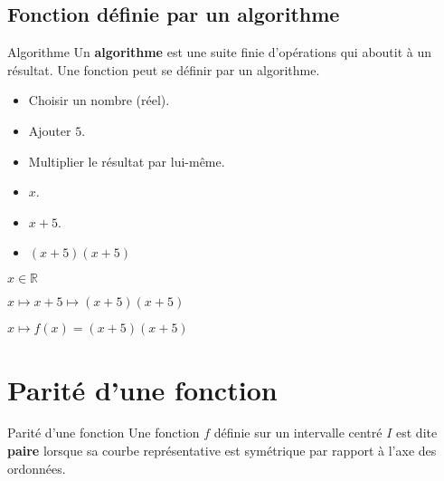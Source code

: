 \begin{pageCours}
 
 
 


\subsection{Fonction définie par un algorithme}


\begin{DefT}{Algorithme}
Un \textbf{algorithme} est une suite finie d'opérations qui aboutit à un résultat. Une fonction peut se définir par un algorithme.
\end{DefT}

 
\begin{Ex}

\begin{minipage}{0.4\linewidth}

\begin{itemize}
\item Choisir un nombre (réel).
\item Ajouter $5$.
\item Multiplier le résultat par lui-même.
\end{itemize}

\end{minipage}
\begin{minipage}{0.3\linewidth}

\begin{itemize}
\item $x$.
\item $x+5$.
\item $(x+5)(x+5)$
\end{itemize}
\end{minipage}
\begin{minipage}{0.3\linewidth}
$x \in \mathbb R$

$x \mapsto x+5 \mapsto(x+5)(x+5)$

$x \mapsto f(x)=(x+5)(x+5)$
\end{minipage}

\end{Ex}


\section{Parité d'une fonction}

\begin{minipage}{0.5\linewidth}
\begin{DefT}{Parité d'une fonction}
Une fonction $f$ définie sur un intervalle centré $I$ est dite \textbf{paire} lorsque sa courbe représentative est symétrique par rapport à l'axe des ordonnées.


\end{DefT}
\end{minipage}
\end{pageCours}

